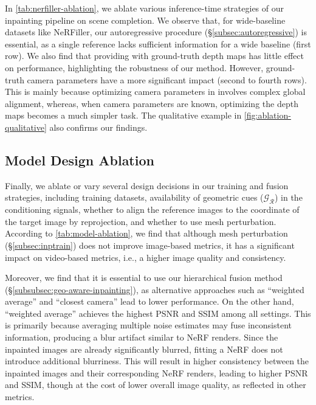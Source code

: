 In \cref{tab:nerfiller-ablation}, 
we ablate various inference-time strategies of our inpainting pipeline on scene completion. 
We observe that, for wide-baseline datasets like NeRFiller, our autoregressive procedure (\S\ref{subsec:autoregressive}) is essential, as a single reference lacks sufficient information for a wide baseline (first row).
We also find that providing \duster with ground-truth depth maps has little effect on performance, highlighting the robustness of our method. However, ground-truth camera parameters have a more significant impact (second to fourth rows). This is mainly because optimizing camera parameters in \duster involves complex global alignment, whereas, when camera parameters are known, optimizing the depth maps becomes a much simpler task.
The qualitative example in \cref{fig:ablation-qualitative} also confirms our findings.

\subsection{Model Design Ablation}

Finally, we ablate or vary several design decisions in our training and fusion strategies, including training datasets, availability of geometric cues ($\mathcal{G_\mathcal{R}}$) in the conditioning signals, whether to align the reference images to the coordinate of the target image by reprojection, and whether to use mesh perturbation. According to \cref{tab:model-ablation}, we find that although mesh perturbation (\S\ref{subsec:inptrain}) does not improve image-based metrics, it has a significant impact on video-based metrics, i.e., a higher image quality and consistency.

Moreover, we find that it is essential to use our hierarchical fusion method (\S\ref{subsubsec:geo-aware-inpainting}), as alternative approaches such as ``weighted average'' and ``closest camera'' lead to lower performance. On the other hand, ``weighted average'' achieves the highest PSNR and SSIM among all settings. 
This is primarily because averaging multiple noise estimates may fuse inconsistent information, producing a blur artifact similar to NeRF renders. Since the inpainted images are already significantly blurred, fitting a NeRF does not introduce additional blurriness. This will result in higher consistency between the inpainted images and their corresponding NeRF renders, leading to higher PSNR and SSIM, though at the cost of lower overall image quality, as reflected in other metrics.


